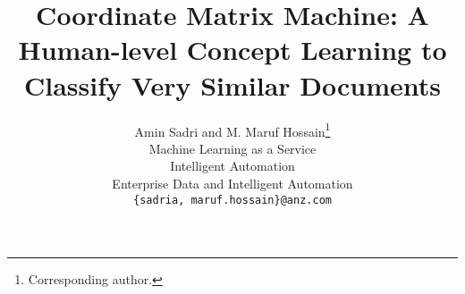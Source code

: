 \documentclass[a4paper, 11pt, twoside]{article}
\theoremstyle{definition}
\theoremstyle{definition}
\newcommand\correspondingauthor{\thanks{Corresponding author.}}
\begin{document}
\monthyeardate
\title{Coordinate Matrix Machine: A Human-level Concept Learning to Classify Very Similar Documents}

\author{Amin Sadri and M. Maruf Hossain\correspondingauthor \\
{\small Machine Learning as a Service} \\
{\small Intelligent Automation} \\
{\small Enterprise Data and Intelligent Automation} \\
{\small \texttt{\{sadria, maruf.hossain\}@anz.com}}
}

\date{}

\maketitle
\thispagestyle{empty}
\end{document}
